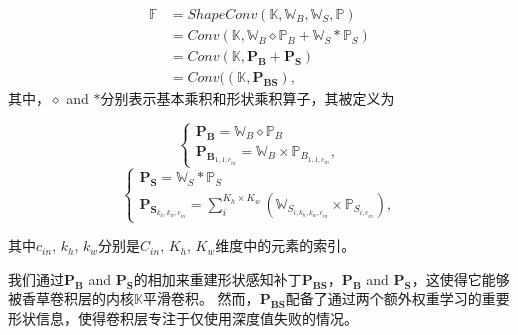 \begin{equation}
	\label{eq:shapeconv-patch}
	\begin{aligned}
		\mathbb{F} &= ShapeConv(\mathbb{K}, \mathbb{W}_B, \mathbb{W}_S, \mathbb{P})\\
		&= Conv(\mathbb{K}, \mathbb{W}_B \diamond \mathbb{P}_B + \mathbb{W}_S \ast \mathbb{P}_S)\\
		&= Conv(\mathbb{K}, \textbf{P}_\textbf{B} + \textbf{P}_\textbf{S})\\
		&= Conv((\mathbb{K}, \textbf{P}_\textbf{BS}),
	\end{aligned}
\end{equation}
其中，$\diamond$ and $\ast$分别表示基本乘积和形状乘积算子，其被定义为

\begin{equation}
	\begin{cases}
		\textbf{P}_\textbf{B} = \mathbb{W}_B \diamond \mathbb{P}_B \\
		\textbf{P}_{\textbf{B}_{1,1,c_{in}}} = \mathbb{W}_B \times \mathbb{P}_{B_{1,1,c_{in}}},
	\end{cases}
	\label{eq:base-product-P}
\end{equation}
\begin{equation}
	\begin{cases}
		\textbf{P}_\textbf{S} = \mathbb{W}_S \ast \mathbb{P}_S \\
		\textbf{P}_{\textbf{S}_{{k_h},{k_w},{c_{in}}}} = \sum_{i}^{K_h \times K_w} (\mathbb{W}_{S_{i,{k_h},{k_w},{c_{in}}}} \times \mathbb{P}_{S_{i,{c_{in}}}}),
	\end{cases}
	\label{eq:shape-product-P}
\end{equation}

其中$c_{in}$, $k_h$, $k_w$分别是$C_{in}$, $K_h$, $K_w$维度中的元素的索引。

我们通过$\textbf{P}_\textbf{B}$ and $\textbf{P}_\textbf{S}$的相加来重建形状感知补丁$\textbf{P}_\textbf{BS}$，$\textbf{P}_\textbf{B}$ and $\textbf{P}_\textbf{S}$，这使得它能够被香草卷积层的内核$\mathbb{K}$平滑卷积。
然而，$\textbf{P}_\textbf{BS}$配备了通过两个额外权重学习的重要形状信息，使得卷积层专注于仅使用深度值失败的情况。

